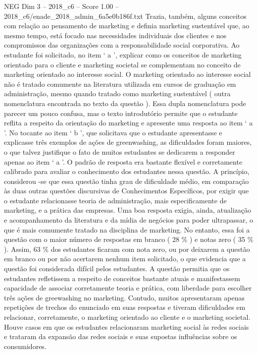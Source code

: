 \begin{textsample}{NEG Dim 3 – 2018\_c6 – Score 1.00 – 2018\_c6/enade\_2018\_admin\_6a5e0b186f.txt}
Trazia, também, alguns conceitos com relação ao pensamento de marketing e definia marketing sustentável que, ao mesmo tempo, está focado nas necessidades individuais dos clientes e nos compromissos das organizações com a responsabilidade social corporativa.
Ao estudante foi solicitado, no item ‘ a ’, explicar como os conceitos de marketing orientado para o cliente e marketing societal se complementam no conceito de marketing orientado ao interesse social.
O marketing orientado ao interesse social não é tratado comumente na literatura utilizada em cursos de graduação em administração, mesmo quando tratado como marketing sustentável ( outra nomenclatura encontrada no texto da questão ).
Essa dupla nomenclatura pode parecer um pouco confusa, mas o texto introdutório permite que o estudante reflita a respeito da orientação do marketing e apresente uma resposta ao item ‘ a ’.
No tocante ao item ‘ b ’, que solicitava que o estudante apresentasse e explicasse três exemplos de ações de greenwashing, as dificuldades foram maiores, o que talvez justifique o fato de muitos estudantes se dedicarem a responder apenas ao item ‘ a ’.
O padrão de resposta era bastante flexível e corretamente calibrado para avaliar o conhecimento dos estudantes nessa questão.
A princípio, considerou -se que essa questão tinha grau de dificuldade médio, em comparação às duas outras questões discursivas de Conhecimentos Específicos, por exigir que o estudante relacionasse teoria de administração, mais especificamente de marketing, e a prática das empresas.
Uma boa resposta exigia, ainda, atualização e acompanhamento da literatura e da mídia de negócios para poder ultrapassar, o que é mais comumente tratado na disciplina de marketing.
No entanto, essa foi a questão com o maior número de respostas em branco ( 28 \% ) e notas zero ( 35 \% ).
Assim, 63 \% dos estudantes ficaram com nota zero, ou por deixarem a questão em branco ou por não acertarem nenhum item solicitado, o que evidencia que a questão foi considerada difícil pelos estudantes.
A questão permitia que os estudantes refletissem a respeito de conceitos bastante atuais e manifestassem capacidade de associar corretamente teoria e prática, com liberdade para escolher três ações de greewashing no marketing.
Contudo, muitos apresentaram apenas repetições de trechos do enunciado em suas respostas e tiveram dificuldades em relacionar, corretamente, o marketing orientado ao cliente e o marketing societal.
Houve casos em que os estudantes relacionaram marketing social às redes sociais e trataram da expansão das redes sociais e suas supostas influências sobre os consumidores.

\end{textsample}
